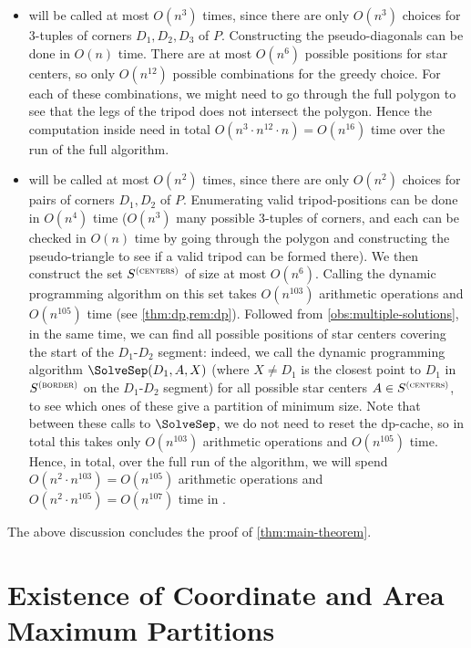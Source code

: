 \documentclass[10pt,a4paper]{article}
\newcommand\Scen{S^{\textsc{(centers)}}}
\newcommand\Sbor{S^{\textsc{(border)}}}
\begin{document}
\begin{itemize}
\item \TripodGreedy{} will be called at most $O(n^3)$ times, since there are only $O(n^3)$ choices for 3-tuples of corners $D_1, D_2, D_3$ of $P$. Constructing the pseudo-diagonals can be done in $O(n)$ time. There are at most $O(n^6)$ possible positions for star centers, so only $O(n^{12})$ possible combinations for the greedy choice. For each of these combinations, we might need to go through the full polygon to see that the legs of the tripod does not intersect the polygon. Hence the computation inside \TripodGreedy{} need in total $O(n^3 \cdot n^{12} \cdot n) = O(n^{16})$ time over the run of the full algorithm.
\item \SolveSub{} will be called at most $O(n^2)$ times, since there are only $O(n^2)$ choices for pairs of corners $D_1, D_2$ of $P$. Enumerating valid tripod-positions can be done in $O(n^4)$ time ($O(n^3)$ many possible 3-tuples of corners, and each can be checked in $O(n)$ time  by going through the polygon and constructing the pseudo-triangle to see if a valid tripod can be formed there). We then construct the set $\Scen$ of size at most $O(n^6)$. Calling the dynamic programming algorithm on this set takes $O(n^{103})$ arithmetic operations and $O(n^{105})$ time (see \cref{thm:dp,rem:dp}). Followed from \cref{obs:multiple-solutions}, in the same time, we can find all possible positions of star centers covering the start of the $D_1$-$D_2$ segment: indeed, we call the dynamic programming algorithm $\SolveSep(D_1,A,X)$ (where $X \neq D_1$ is the closest point to $D_1$ in $\Sbor$ on the $D_1$-$D_2$ segment) for all possible star centers $A\in \Scen$, to see which ones of these give a partition of minimum size. Note that between these calls to $\SolveSep$, we do not need to reset the dp-cache, so in total this takes only $O(n^{103})$ arithmetic operations and $O(n^{105})$ time.
Hence, in total, over the full run of the algorithm, we will spend $O(n^2 \cdot n^{103}) = O(n^{105})$ arithmetic operations and $O(n^2 \cdot n^{105}) = O(n^{107})$ time in \SolveSub.
\end{itemize}
The above discussion concludes the proof of \cref{thm:main-theorem}.



\newpage



\appendix



\newpage
\section{Existence of Coordinate and Area Maximum Partitions}
\label{apx:existence}
\end{document}
